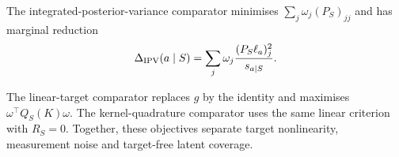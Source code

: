 The integrated-posterior-variance comparator minimises
$\sum_j\omega_j(P_S)_{jj}$ and has marginal reduction
\begin{equation}
\Delta_{\rm IPV}(a\mid S)
=\sum_j\omega_j\frac{(P_S\ell_a)_j^2}{s_{a\mid S}}.
\label{eq:ipv-gain}
\end{equation}

The linear-target comparator replaces $g$ by the identity and maximises
$\omega^\top Q_S(K)\omega$. The kernel-quadrature comparator uses the same
linear criterion with $R_S=0$. Together, these objectives separate target
nonlinearity, measurement noise and target-free latent coverage.
